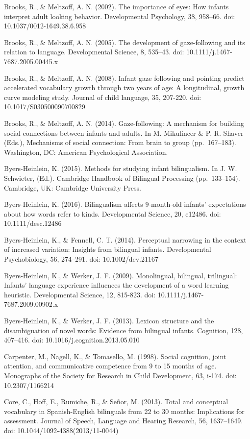 \documentclass[,man,floatsintext]{apa6}
\begin{document}
Brooks, R., \& Meltzoff, A. N. (2002). The importance of eyes: How infants interpret adult looking behavior. Developmental Psychology, 38, 958--66. doi: 10.1037/0012-1649.38.6.958

Brooks, R., \& Meltzoff, A. N. (2005). The development of gaze-following and its relation to language. Developmental Science, 8, 535--43. doi: 10.1111/j.1467-7687.2005.00445.x

Brooks, R., \& Meltzoff, A. N. (2008). Infant gaze following and pointing predict accelerated vocabulary growth through two years of age: A longitudinal, growth curve modeling study. Journal of child language, 35, 207-220. doi: 10.1017/S030500090700829

Brooks, R., \& Meltzoff, A. N. (2014). Gaze-following: A mechanism for building social connections between infants and adults. In M. Mikulincer \& P. R. Shaver (Eds.), Mechanisms of social connection: From brain to group (pp.~167--183). Washington, DC: American Psychological Association.

Byers-Heinlein, K. (2015). Methods for studying infant bilingualism. In J. W. Schwieter, (Ed.). Cambridge Handbook of Bilingual Processing (pp.~133--154). Cambridge, UK: Cambridge University Press.

Byers-Heinlein, K. (2016). Bilingualism affects 9-month-old infants' expectations about how words refer to kinds. Developmental Science, 20, e12486. doi: 10.1111/desc.12486

Byers-Heinlein, K., \& Fennell, C. T. (2014). Perceptual narrowing in the context of increased variation: Insights from bilingual infants. Developmental Psychobiology, 56, 274--291. doi: 10.1002/dev.21167

Byers-Heinlein, K., \& Werker, J. F. (2009). Monolingual, bilingual, trilingual: Infants' language experience influences the development of a word learning heuristic. Developmental Science, 12, 815-823. doi: 10.1111/j.1467-7687.2009.00902.x

Byers-Heinlein, K., \& Werker, J. F. (2013). Lexicon structure and the disambiguation of novel words: Evidence from bilingual infants. Cognition, 128, 407--416. doi: 10.1016/j.cognition.2013.05.010

Carpenter, M., Nagell, K., \& Tomasello, M. (1998). Social cognition, joint attention, and communicative competence from 9 to 15 months of age. Monographs of the Society for Research in Child Development, 63, i-174. doi: 10.2307/1166214

Core, C., Hoff, E., Rumiche, R., \& Señor, M. (2013). Total and conceptual vocabulary in Spanish-English bilinguals from 22 to 30 months: Implications for assessment. Journal of Speech, Language and Hearing Research, 56, 1637--1649. doi: 10.1044/1092-4388(2013/11-0044)
\end{document}
